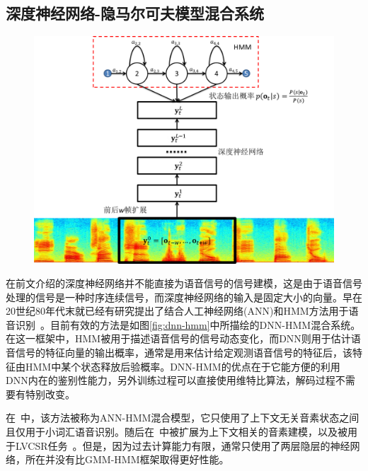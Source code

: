 \subsection{深度神经网络-隐马尔可夫模型混合系统}

\label{sec:dnn_hmm}

\begin{figure}[!htp]
  \centering
    \captionstyle{\centering}
    \includegraphics[width=.618\textwidth]{figure/dnn_hmm.png}
\end{figure}

在前文介绍的深度神经网络并不能直接为语音信号的信号建模，这是由于语音信号处理的信号是一种时序连续信号，而深度神经网络的输入是固定大小的向量。早在20世纪80年代末就已经有研究提出了结合人工神经网络(ANN)和HMM方法用于语音识别~\cite{trentin2001survey}。目前有效的方法是如图\ref{fig:dnn-hmm}中所描绘的DNN-HMM混合系统。在这一框架中，HMM被用于描述语音信号的信号动态变化，而DNN则用于估计语音信号的特征向量的输出概率，通常是用来估计给定观测语音信号的特征后，该特征由HMM中某个状态释放后验概率。DNN-HMM的优点在于它能方便的利用DNN内在的鉴别性能力，另外训练过程可以直接使用维特比算法，解码过程不需要有特别改变。

在~\cite{bourlard1989continuous,bourlard1989links,morgan1990continuous}中，该方法被称为ANN-HMM混合模型，它只使用了上下文无关音素状态之间且仅用于小词汇语音识别。随后在~\cite{bourlard1992cdnn}中被扩展为上下文相关的音素建模，以及被用于LVCSR任务~\cite{robinson2002connectionist}。但是，因为过去计算能力有限，通常只使用了两层隐层的神经网络，所在并没有比GMM-HMM框架取得更好性能。

